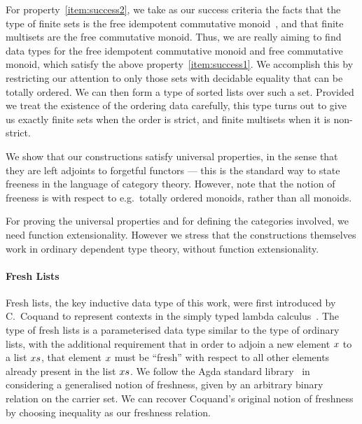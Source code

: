 \documentclass[a4paper]{easychair}
\newcommand{\AgdaBoundFontStyle}[1]{\textit{#1}}
\newcommand{\AgdaFormat}[2]{#2}
\newcommand{\AgdaNoSpaceMath}[1]
    {\begingroup\thickmuskip=0mu\medmuskip=0mu#1\endgroup}
\newcommand{\AgdaBound}[1]
    {\AgdaNoSpaceMath{\textcolor{AgdaBound}{\AgdaBoundFontStyle{\AgdaFormat{#1}{#1}}}}}
\newcommand\bv[1]{{\AgdaBound{$#1$}}}
\begin{document}
For property~\eqref{item:success2}, we take as our success criteria the facts that
the type of finite sets is the free idempotent commutative monoid~\cite{frumin2018finsetshott},
and that finite multisets are the free commutative monoid.
Thus, we are really aiming to find data types for the free idempotent commutative monoid and free commutative monoid, which satisfy the above property~\eqref{item:success1}.
We accomplish this by restricting our attention to only those sets with decidable equality that can be totally ordered.
We can then form a type of sorted lists over such a set.
Provided we treat the existence of the ordering data carefully, this type turns out to give us exactly finite sets when the order is strict, and finite multisets when it is non-strict.

We show that our constructions satisfy universal properties, in the sense that they are left adjoints to forgetful functors --- this is the standard way to state freeness in the language of category theory.
However, note that the notion of freeness is with respect to e.g.\ totally ordered monoids, rather than all monoids.

For proving the universal properties and for defining the categories involved, we need function extensionality.
However we stress that the constructions themselves work in ordinary dependent type theory, without function extensionality.

\paragraph{Fresh Lists}
Fresh lists, the key inductive data type of this work, were first introduced by C.~Coquand to represent contexts in the simply typed lambda calculus~\cite{ccoquand2002formalstlc}.
The type of fresh lists is a parameterised data type similar to the type of ordinary lists,
with the additional requirement that in order to adjoin
a new element $\bv{x}$ to a list $\bv{xs}$, that element $\bv{x}$ must be ``fresh'' with respect to all other elements already present in the list $\bv{xs}$.
We follow the Agda standard library~\cite{agda-stdlib} in considering a generalised notion of freshness, given by an arbitrary binary relation on the carrier set.
We can recover Coquand's original notion of freshness by choosing inequality as our freshness relation.
\end{document}
